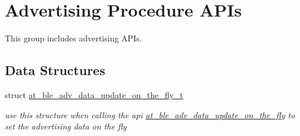 \hypertarget{group__gap__adv__group}{}\section{Advertising Procedure A\+P\+Is}
\label{group__gap__adv__group}


This group includes advertising A\+P\+Is.  


\subsection*{Data Structures}
\begin{DoxyCompactItemize}
\item 
struct \mbox{\hyperlink{structat__ble__adv__data__update__on__the__fly__t}{at\+\_\+ble\+\_\+adv\+\_\+data\+\_\+update\+\_\+on\+\_\+the\+\_\+fly\+\_\+t}}
\begin{DoxyCompactList}\small\item\em use this structure when calling the api \mbox{\hyperlink{group__gap__adv__group_ga6dbd9fb49cc0fb4feecd09c87ba29518}{at\+\_\+ble\+\_\+adv\+\_\+data\+\_\+update\+\_\+on\+\_\+the\+\_\+fly}} to set the advertising data on the fly \end{DoxyCompactList}\end{DoxyCompactItemize}
